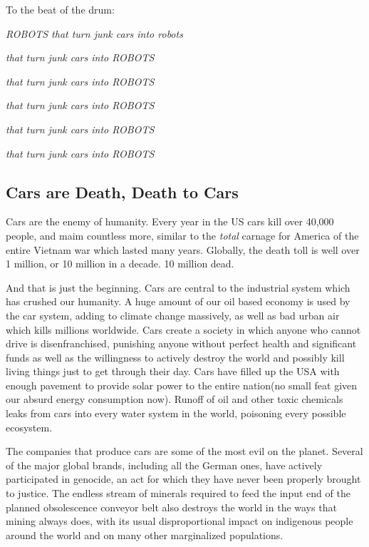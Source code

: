 To the beat of the drum:

\emph{ROBOTS that turn junk cars into robots}

\emph{that turn junk cars into ROBOTS}

\emph{that turn junk cars into ROBOTS}

\emph{that turn junk cars into ROBOTS}

\emph{that turn junk cars into ROBOTS}

\emph{that turn junk cars into ROBOTS}

\subsection{Cars are Death, Death to
Cars}\label{cars-are-death-death-to-cars}

Cars are the enemy of humanity. Every year in the US cars kill over
40,000 people, and maim countless more, similar to the \emph{total}
carnage for America of the entire Vietnam war which lasted many years.
Globally, the death toll is well over 1 million, or 10 million in a
decade. 10 million dead.

And that is just the beginning. Cars are central to the industrial
system which has crushed our humanity. A huge amount of our oil based
economy is used by the car system, adding to climate change massively,
as well as bad urban air which kills millions worldwide. Cars create a
society in which anyone who cannot drive is disenfranchised, punishing
anyone without perfect health and significant funds as well as the
willingness to actively destroy the world and possibly kill living
things just to get through their day. Cars have filled up the USA with
enough pavement to provide solar power to the entire nation(no small
feat given our absurd energy consumption now). Runoff of oil and other
toxic chemicals leaks from cars into every water system in the world,
poisoning every possible ecosystem.

The companies that produce cars are some of the most evil on the planet.
Several of the major global brands, including all the German ones, have
actively participated in genocide, an act for which they have never been
properly brought to justice. The endless stream of minerals required to
feed the input end of the planned obsolescence conveyor belt also
destroys the world in the ways that mining always does, with its usual
disproportional impact on indigenous people around the world and on many
other marginalized populations.

